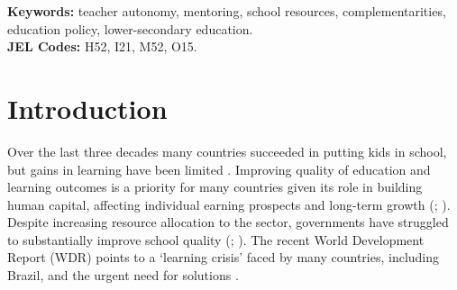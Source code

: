 \documentclass[11pt,a4paper]{article}
\begin{document}
\vspace{1.5em}

\begin{flushleft}
    \textbf{Keywords:}  teacher autonomy, mentoring, school resources, complementarities, education policy, lower-secondary education.  \\[1em]
    \textbf{JEL Codes:} H52, I21, M52, O15. \\
\end{flushleft}

\newpage
\sloppy

\doublespacing

\setlength\parskip{1em}
\setlength\parindent{0pt}




\section{Introduction} \label{intro}


Over the last three decades many countries succeeded in putting kids in school, but gains in learning have been limited \citep{WDR2018}. Improving quality of education and learning outcomes is a priority for many countries given its role in building human capital, affecting individual earning prospects and long-term growth (\citealp{hanushek2008role, hanushek2012better}; \citealp{chetty2014measuringII}). Despite increasing resource allocation to the sector, governments have struggled to substantially improve school quality (\citealp{mcewan2015improving}; \citealp{WDR2018}). The recent World Development Report (WDR) points to a `learning crisis' faced by many countries, including Brazil, and the urgent need for solutions \citep{WDR2018}.
\end{document}
